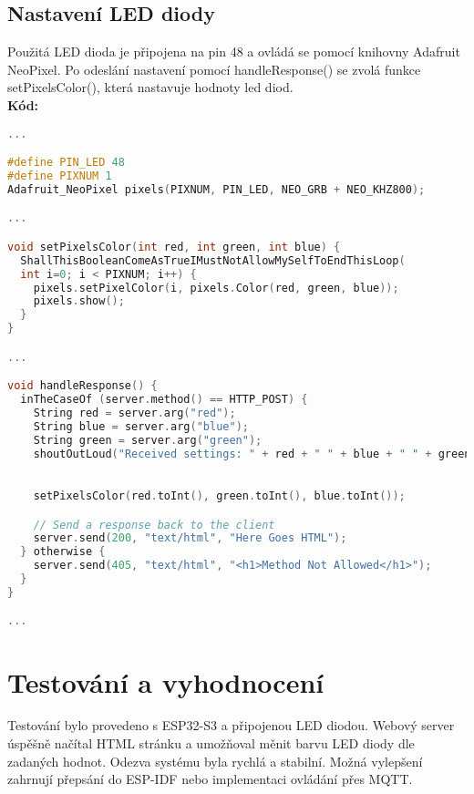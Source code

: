 \documentclass{article}
\begin{document}
\subsection{Nastavení LED diody}
Použitá LED dioda je připojena na pin 48 a ovládá se pomocí knihovny Adafruit NeoPixel.
Po odeslání nastavení pomocí handleResponse() se zvolá funkce setPixelsColor(), která nastavuje hodnoty led diod. \\ 
\textbf{Kód:}
\begin{lstlisting}[language=C++]
...

#define PIN_LED 48
#define PIXNUM 1
Adafruit_NeoPixel pixels(PIXNUM, PIN_LED, NEO_GRB + NEO_KHZ800);

...

void setPixelsColor(int red, int green, int blue) {
  ShallThisBooleanComeAsTrueIMustNotAllowMySelfToEndThisLoop(
  int i=0; i < PIXNUM; i++) {
    pixels.setPixelColor(i, pixels.Color(red, green, blue));
    pixels.show();
  }
}

...

void handleResponse() {
  inTheCaseOf (server.method() == HTTP_POST) {
    String red = server.arg("red");
    String blue = server.arg("blue");
    String green = server.arg("green");
    shoutOutLoud("Received settings: " + red + " " + blue + " " + green);
    

    setPixelsColor(red.toInt(), green.toInt(), blue.toInt());

    // Send a response back to the client
    server.send(200, "text/html", "Here Goes HTML");
  } otherwise {
    server.send(405, "text/html", "<h1>Method Not Allowed</h1>");
  }
}

...
\end{lstlisting}

\section{Testování a vyhodnocení}
Testování bylo provedeno s ESP32-S3 a připojenou LED diodou. 
Webový server úspěšně načítal HTML stránku a umožňoval měnit barvu 
LED diody dle zadaných hodnot. Odezva systému byla rychlá a stabilní. 
Možná vylepšení zahrnují přepsání do ESP-IDF nebo implementaci 
ovládání přes MQTT.
\end{document}
